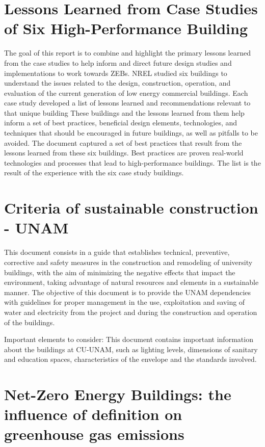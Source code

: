 \section{Lessons Learned from Case Studies of Six High-Performance Building}
The goal of this report is to combine and highlight the primary lessons learned from the case studies to help inform and direct future design studies and implementations to work towards ZEBs. NREL studied six buildings to understand the issues related to the design, construction, operation, and evaluation of the current generation of low energy commercial buildings. Each case study developed a list of lessons learned and recommendations relevant to that unique building These buildings and the lessons learned from them help inform a set of best practices, beneficial design elements, technologies, and techniques that should be encouraged in future buildings, as well as pitfalls to be avoided. The document captured a set of best practices that result from the lessons learned from these six buildings. Best practices are proven real-world technologies and processes that lead to high-performance buildings. The list is the result of the experience with the six case study buildings.

\section{Criteria of sustainable construction - UNAM}
This document consists in a guide that establishes technical, preventive, corrective and safety measures in the construction and remodeling of university buildings, with the aim of minimizing the negative effects that impact the environment, taking advantage of natural resources and elements in a sustainable manner.  The objective of this document is to provide the UNAM dependencies with guidelines for proper management in the use, exploitation and saving of water and electricity from the project and during the construction and operation of the buildings.

Important elements to consider: This document contains important information about the buildings at CU-UNAM, such as lighting levels, dimensions of sanitary and education spaces, characteristics of the envelope and the standards involved.

\section{Net-Zero Energy Buildings: the influence of definition on greenhouse gas emissions}

